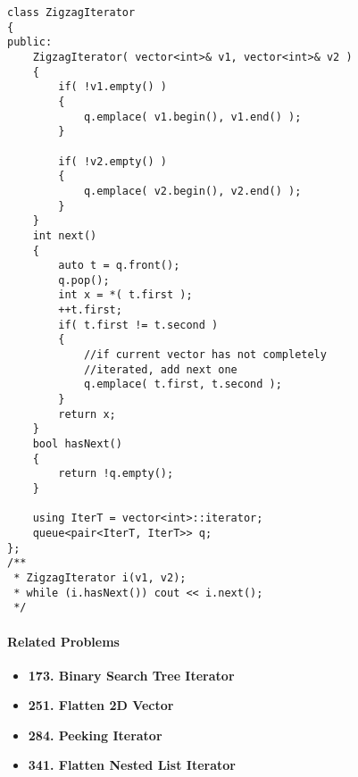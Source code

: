 \setcounter{lstlisting}{0}
\begin{lstlisting}[style=customc, caption={Queue}]
class ZigzagIterator
{
public:
    ZigzagIterator( vector<int>& v1, vector<int>& v2 )
    {
        if( !v1.empty() )
        {
            q.emplace( v1.begin(), v1.end() );
        }

        if( !v2.empty() )
        {
            q.emplace( v2.begin(), v2.end() );
        }
    }
    int next()
    {
        auto t = q.front();
        q.pop();
        int x = *( t.first );
        ++t.first;
        if( t.first != t.second )
        {
            //if current vector has not completely
            //iterated, add next one
            q.emplace( t.first, t.second );
        }
        return x;
    }
    bool hasNext()
    {
        return !q.empty();
    }

    using IterT = vector<int>::iterator;
    queue<pair<IterT, IterT>> q;
};
/**
 * ZigzagIterator i(v1, v2);
 * while (i.hasNext()) cout << i.next();
 */
\end{lstlisting}

\paragraph{Related Problems}
\begin{itemize}
\item \textbf{173. Binary Search Tree Iterator}
\item \textbf{251. Flatten 2D Vector}
\item \textbf{284. Peeking Iterator}
\item \textbf{341. Flatten Nested List Iterator}
\end{itemize}